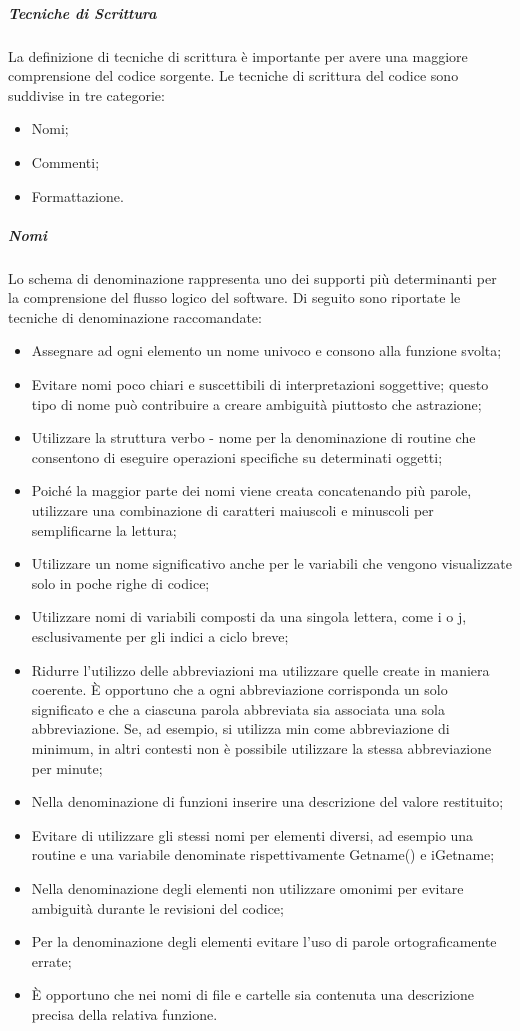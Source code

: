 \subparagraph{Tecniche di Scrittura}
La definizione di tecniche di scrittura è importante per avere una maggiore comprensione del codice sorgente.
Le tecniche di scrittura del codice sono suddivise in tre categorie:
\begin{itemize}
\item
Nomi;
\item
Commenti;
\item
Formattazione.
\end{itemize}

\subparagraph{Nomi}
Lo schema di denominazione rappresenta uno dei supporti più determinanti per la comprensione del flusso logico del software.
Di seguito sono riportate le tecniche di denominazione raccomandate:
\begin{itemize}
\item
Assegnare ad ogni elemento un nome univoco e consono alla funzione svolta;
\item
Evitare nomi poco chiari e suscettibili di interpretazioni soggettive; questo tipo di nome può contribuire a creare ambiguità piuttosto che astrazione;
\item
Utilizzare la struttura verbo - nome per la denominazione di routine che consentono di eseguire operazioni specifiche su determinati oggetti;
\item
Poiché la maggior parte dei nomi viene creata concatenando più parole, utilizzare una combinazione di caratteri maiuscoli e minuscoli per semplificarne la lettura;
\item
Utilizzare un nome significativo anche per le variabili che vengono visualizzate solo in poche righe di codice;
\item
Utilizzare nomi di variabili composti da una singola lettera, come i o j, esclusivamente per gli indici a ciclo breve;
\item
Ridurre l'utilizzo delle abbreviazioni ma utilizzare quelle create in maniera coerente. È opportuno che a ogni abbreviazione corrisponda un solo significato e che a ciascuna parola abbreviata sia associata una sola abbreviazione. Se, ad esempio, si utilizza min come abbreviazione di minimum, in altri contesti non è possibile utilizzare la stessa abbreviazione per minute;
\item
Nella denominazione di funzioni inserire una descrizione del valore restituito;
\item
Evitare di utilizzare gli stessi nomi per elementi diversi, ad esempio una routine e una variabile denominate rispettivamente Getname() e iGetname;
\item
Nella denominazione degli elementi non utilizzare omonimi per evitare ambiguità durante le revisioni del codice;
\item
Per la denominazione degli elementi evitare l'uso di parole ortograficamente errate;
\item
È opportuno che nei nomi di file e cartelle sia contenuta una descrizione precisa della relativa funzione.
\end{itemize}


